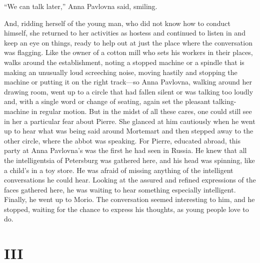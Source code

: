 ``We can talk later,'' Anna Pavlovna said, smiling. %

And, ridding herself of the young man, who did not know how to conduct
himself, she returned to her activities as hostess and continued to
listen in and keep an eye on things, ready to help out at just the
place where the conversation was flagging. Like the owner of a
cotton mill who sets his workers in their places, walks around the
establishment, noting a stopped machine or a spindle that is making an
unusually loud screeching noise, moving hastily and stopping the
machine or putting it on the right track---so Anna Pavlovna, walking
around her drawing room, went up to a circle that had fallen silent or
was talking too loudly and, with a single word or change of seating,
again set the pleasant talking-machine in regular motion. But in the
midst of all these cares, one could still see in her a particular fear
about Pierre. She glanced at him cautiously when he went up to hear
what was being said around Mortemart and then stepped away to the
other circle, where the abbot was speaking. For Pierre, educated
abroad, this party at Anna Pavlovna's was the first he had seen in
Russia. He knew that all the intelligentsia of Petersburg was gathered
here, and his head was spinning, like a child's in a toy store. He was
afraid of missing anything of the intelligent conversations he could
hear. Looking at the assured and refined expressions of the faces
gathered here, he was waiting to hear something especially
intelligent. Finally, he went up to Morio. The conversation seemed
interesting to him, and he stopped, waiting for the chance to express
his thoughts, as young people love to do.

\section*{III} %

